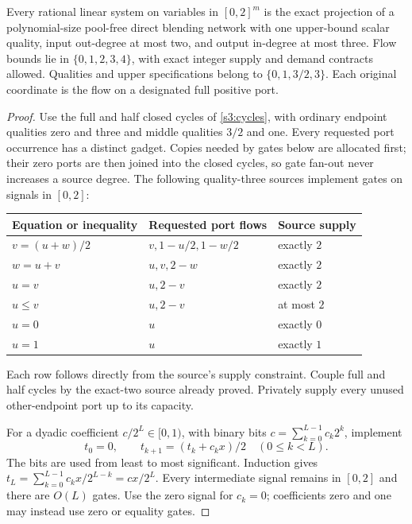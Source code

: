 \begin{lemma}\label{s3:linear-circuits}
Every rational linear system on variables in $[0,2]^m$ is the exact
projection of a polynomial-size pool-free direct blending network with
one upper-bound scalar quality, input out-degree at most two, and output
in-degree at most three. Flow bounds lie in $\{0,1,2,3,4\}$, with exact
integer supply and demand contracts allowed. Qualities and upper
specifications belong to $\{0,1,3/2,3\}$. Each original coordinate
is the flow on a designated full positive port.
\end{lemma}
\begin{proof}
Use the full and half closed cycles of \cref{s3:cycles}, with ordinary
endpoint qualities zero and three and middle qualities $3/2$ and one.
Every requested port occurrence has a distinct gadget. Copies needed
by gates below are allocated first; their zero ports are then joined
into the closed cycles, so gate fan-out never increases a source degree.
The following
quality-three sources implement gates on signals in $[0,2]$:
\begin{center}
\begin{tabular}{lll}
\toprule
Equation or inequality & Requested port flows & Source supply\\
\midrule
$v=(u+w)/2$ & $v,1-u/2,1-w/2$ & exactly $2$\\
$w=u+v$ & $u,v,2-w$ & exactly $2$\\
$u=v$ & $u,2-v$ & exactly $2$\\
$u\le v$ & $u,2-v$ & at most $2$\\
$u=0$ & $u$ & exactly $0$\\
$u=1$ & $u$ & exactly $1$\\
\bottomrule
\end{tabular}
\end{center}
Each row follows directly from the source's supply constraint. Couple
full and half cycles by the exact-two source already proved. Privately
supply every unused other-endpoint port up to its capacity.

For a dyadic coefficient $c/2^L\in[0,1)$, with binary bits
$c=\sum_{k=0}^{L-1}c_k2^k$, implement
\begin{equation}
 t_0=0,\qquad t_{k+1}=(t_k+c_kx)/2\quad(0\le k<L).
 \label{s3:binary-multiplier}
\end{equation}
The bits are used from least to most significant. Induction gives
$t_L=\sum_{k=0}^{L-1}c_kx/2^{L-k}=cx/2^L$.
Every intermediate signal remains in $[0,2]$ and there are $O(L)$ gates.
Use the zero signal for $c_k=0$; coefficients zero and one may instead
use zero or equality gates.


\end{proof}
